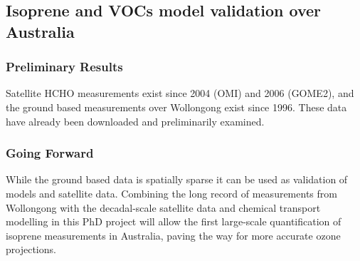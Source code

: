 \subsection{Isoprene and VOCs model validation over Australia}
\subsubsection{Preliminary Results}

Satellite HCHO measurements exist since 2004 (OMI) and 2006 (GOME2), and the ground based measurements over Wollongong exist since 1996. 
These data have already been downloaded and preliminarily examined.


\subsubsection{Going Forward}
While the ground based data is spatially sparse it can be used as validation of models and satellite data. 
Combining the long record of measurements from Wollongong with the decadal-scale satellite data and chemical transport modelling in this PhD project will allow the first large-scale quantification of isoprene measurements in Australia, paving the way for more accurate ozone projections.